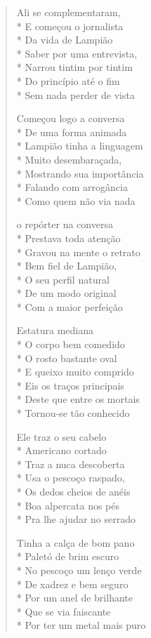 \begin{verse}
Ali se complementaram,\\*
E começou o jornalista\\*
Da vida de Lampião\\*
Saber por uma entrevista,\\*
Narrou tintim por tintim\\*
Do princípio até o fim\\*
Sem nada perder de vista

Começou logo a conversa\\*
De uma forma animada\\*
Lampião tinha a linguagem\\*
Muito desembaraçada,\\*
Mostrando sua importância\\*
Falando com arrogância\\*
Como quem não via nada

o repórter na conversa\\*
Prestava toda atenção\\*
Gravou na mente o retrato\\*
Bem fiel de Lampião,\\*
O seu perfil natural\\*
De um modo original\\*
Com a maior perfeição

Estatura mediana\\*
O corpo bem comedido\\*
O rosto bastante oval\\*
E queixo muito comprido\\*
Eis os traços principais\\*
Deste que entre os mortais\\*
Tornou-se tão conhecido

Ele traz o seu cabelo\\*
Americano cortado\\*
Traz a nuca descoberta\\*
Usa o pescoço raspado,\\*
Os dedos cheios de anéis\\*
Boa alpercata nos pés\\*
Pra lhe ajudar no serrado

Tinha a calça de bom pano\\*
Paletó de brim escuro\\*
No pescoço um lenço verde\\*
De xadrez e bem seguro\\*
Por um anel de brilhante\\*
Que se via faiscante\\*
Por ter um metal mais puro


\end{verse}
